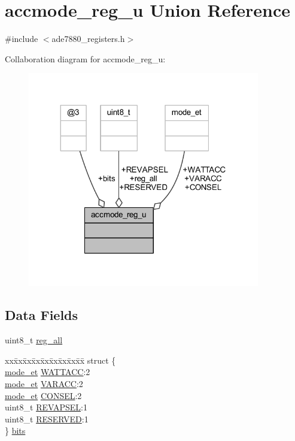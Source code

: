 \hypertarget{a00010}{\section{accmode\-\_\-reg\-\_\-u Union Reference}
\label{d7/dec/a00010}
}


{\ttfamily \#include $<$ade7880\-\_\-registers.\-h$>$}



Collaboration diagram for accmode\-\_\-reg\-\_\-u\-:\nopagebreak
\begin{figure}[H]
\begin{center}
\leavevmode
\includegraphics[width=287pt]{d1/d22/a00057}
\end{center}
\end{figure}
\subsection*{Data Fields}
\begin{DoxyCompactItemize}
\item 
uint8\-\_\-t \hyperlink{a00010_ab2957613fa7f241407cc98e80676dccf}{reg\-\_\-all}
\item 
\begin{tabbing}
xx\=xx\=xx\=xx\=xx\=xx\=xx\=xx\=xx\=\kill
struct \{\\
\>\hyperlink{a00036_a2f9fad1776ad62bb8d7627582ecf8fd5}{mode\_et} \hyperlink{a00010_a26c5c03d2e106e684995adb416204828}{WATTACC}:2\\
\>\hyperlink{a00036_a2f9fad1776ad62bb8d7627582ecf8fd5}{mode\_et} \hyperlink{a00010_a2de2a628e0571ead2bdbac8d62b5c99c}{VARACC}:2\\
\>\hyperlink{a00036_a2f9fad1776ad62bb8d7627582ecf8fd5}{mode\_et} \hyperlink{a00010_a12715df22b18d10a091a29d2dc9a9fd2}{CONSEL}:2\\
\>uint8\_t \hyperlink{a00010_ab5804ea3c0987a8aee88c476b43ba8fa}{REVAPSEL}:1\\
\>uint8\_t \hyperlink{a00010_ad5d4752b467b6c64a9b5fa14d65c71b2}{RESERVED}:1\\
\} \hyperlink{a00010_ac009f1731d8589cf40ae685a468204a7}{bits}\\

\end{tabbing}\end{DoxyCompactItemize}


